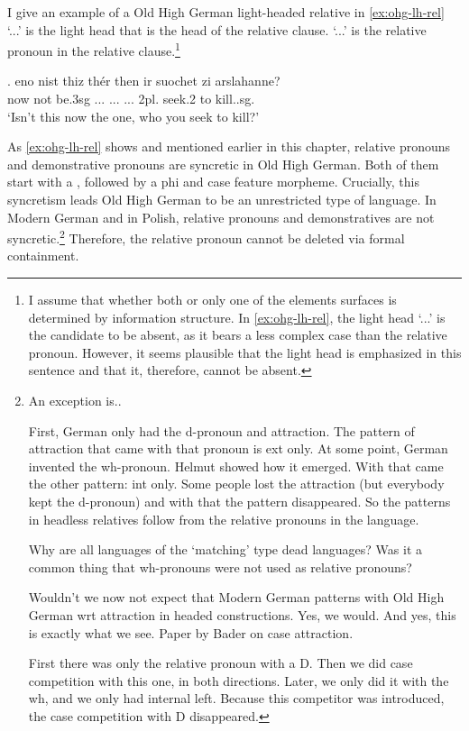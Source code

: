I give an example of a Old High German light-headed relative in \ref{ex:ohg-lh-rel}
 `...' is the light head that is the head of the relative clause.
 `...' is the relative pronoun in the relative clause.\footnote{
I assume that whether both or only one of the elements surfaces is determined by information structure. In \ref{ex:ohg-lh-rel}, the light head  `...' is the candidate to be absent, as it bears a less complex case than the relative pronoun. However, it seems plausible that the light head is emphasized in this sentence and that it, therefore, cannot be absent.
}

\exg. eno nist thiz thér then ir suochet zi arslahanne?\\
 now {not be.3\ac{sg}} ... ...
 ... 2\ac{pl}. seek.2 to kill..\ac{sg}.\\
 `Isn't this now the one, who you seek to kill?'\label{ex:ohg-lh-rel}

As \ref{ex:ohg-lh-rel} shows and mentioned earlier in this chapter, relative pronouns and demonstrative pronouns are syncretic in Old High German. Both of them start with a , followed by a phi and case feature morpheme. Crucially, this syncretism leads Old High German to be an unrestricted type of language. In Modern German and in Polish, relative pronouns and demonstratives are not syncretic.\footnote{
An exception is..

First, German only had the d-pronoun and attraction. The pattern of attraction that came with that pronoun is ext only.
At some point, German invented the wh-pronoun. Helmut showed how it emerged. With that came the other pattern: int only. Some people lost the attraction (but everybody kept the d-pronoun) and with that the pattern disappeared.
So the patterns in headless relatives follow from the relative pronouns in the language.

Why are all languages of the `matching' type dead languages?
Was it a common thing that wh-pronouns were not used as relative pronouns?

Wouldn't we now not expect that Modern German patterns with Old High German wrt attraction in headed constructions. Yes, we would. And yes, this is exactly what we see. Paper by Bader on case attraction.

First there was only the relative pronoun with a D. Then we did case competition with this one, in both directions. Later, we only did it with the wh, and we only had internal left. Because this competitor was introduced, the case competition with D disappeared.
} Therefore, the relative pronoun cannot be deleted via formal containment.


